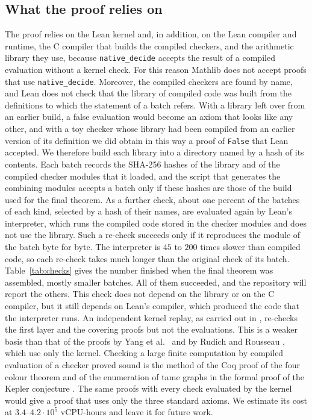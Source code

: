 \documentclass[11pt]{amsart}
\theoremstyle{definition}
\theoremstyle{remark}
\numberwithin{equation}{section}
\begin{document}
\subsection{What the proof relies on}
The proof relies on the Lean kernel and, in addition, on the Lean compiler and runtime, the C compiler that builds the compiled checkers, and the arithmetic library they use, because \texttt{native\_decide} accepts the result of a compiled evaluation without a kernel check. For this reason Mathlib does not accept proofs that use \texttt{native\_decide}. Moreover, the compiled checkers are found by name, and Lean does not check that the library of compiled code was built from the definitions to which the statement of a batch refers. With a library left over from an earlier build, a false evaluation would become an axiom that looks like any other, and with a toy checker whose library had been compiled from an earlier version of its definition we did obtain in this way a proof of \texttt{False} that Lean accepted. We therefore build each library into a directory named by a hash of its contents. Each batch records the SHA-256 hashes of the library and of the compiled checker modules that it loaded, and the script that generates the combining modules accepts a batch only if these hashes are those of the build used for the final theorem. As a further check, about one percent of the batches of each kind, selected by a hash of their names, are evaluated again by Lean's interpreter, which runs the compiled code stored in the checker modules and does not use the library. Such a re-check succeeds only if it reproduces the module of the batch byte for byte. The interpreter is $45$ to $200$ times slower than compiled code, so each re-check takes much longer than the original check of its batch. Table~\ref{tab:checks} gives the number finished when the final theorem was assembled, mostly smaller batches. All of them succeeded, and the repository will report the others. This check does not depend on the library or on the C compiler, but it still depends on Lean's compiler, which produced the code that the interpreter runs. An independent kernel replay, as carried out in \cite{RR26}, re-checks the first layer and the covering proofs but not the evaluations. This is a weaker basis than that of the proofs by Yang et al.\ \cite{Yan26} and by Rudich and Rousseau \cite{RR26}, which use only the kernel. Checking a large finite computation by compiled evaluation of a checker proved sound is the method of the Coq proof of the four colour theorem \cite{Gon08} and of the enumeration of tame graphs in the formal proof of the Kepler conjecture \cite{Hal17}. The same proofs with every check evaluated by the kernel would give a proof that uses only the three standard axioms. We estimate its cost at $3.4$--$4.2\cdot 10^{5}$ vCPU-hours and leave it for future work.
\end{document}
